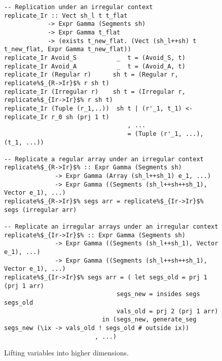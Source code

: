 \begin{figure}
\begin{lstlisting}[style=ndp]
-- Replication under an irregular context
replicate_Ir :: Vect sh_l t t_flat
            -> Expr Gamma (Segments sh)
            -> Expr Gamma t_flat
            -> (exists t_new_flat. (Vect (sh_l++sh) t t_new_flat, Expr Gamma t_new_flat))
replicate_Ir Avoid_S           _  t = (Avoid_S, t)
replicate_Ir Avoid_A           _  t = (Avoid_A, t)
replicate_Ir (Regular r)      sh t = (Regular r, replicate%$_{R->Ir}$% r sh t)
replicate_Ir (Irregular r)    sh t = (Irregular r, replicate%$_{Ir->Ir}$% r sh t)
replicate_Ir (Tuple (r_1,..))  sh t | (r'_1, t_1) <- replicate_Ir r_0 sh (prj 1 t)
                                  , ...
                                  = (Tuple (r'_1, ...), (t_1, ...))

-- Replicate a regular array under an irregular context
replicate%$_{R->Ir}$% :: Expr Gamma (Segments sh)
              -> Expr Gamma (Array (sh_l++sh_1) e_1, ...)
              -> Expr Gamma ((Segments (sh_l++sh++sh_1), Vector e_1), ...)
replicate%$_{R->Ir}$% segs arr = replicate%$_{Ir->Ir}$% segs (irregular arr)

-- Replicate an irregular arrays under an irregular context
replicate%$_{Ir->Ir}$% :: Expr Gamma (Segments sh)
              -> Expr Gamma ((Segments (sh_l++sh_1), Vector e_1), ...)
              -> Expr Gamma ((Segments (sh_l++sh++sh_1), Vector e_1), ...)
replicate%$_{Ir->Ir}$% segs arr = ( let segs_old = prj 1 (prj 1 arr)
                               segs_new = insides segs segs_old
                               vals_old = prj 2 (prj 1 arr)
                           in (segs_new, generate_seg segs_new (\ix -> vals_old ! segs_old # outside ix))
                         , ...)
\end{lstlisting}
\caption{Lifting variables into higher dimensions.}
\label{fig:lst-variables}
\end{figure}

